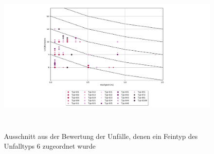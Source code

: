 \begin{savenotes}
	\begin{figure}[H]
		\centering
		\includegraphics[width=12cm,height=8cm]{figures/Bewertung_FT6(2)}
		\caption[Ausschnitt aus der Bewertung der Unfälle, denen ein Feintyp des Unfalltyps 6 zugeordnet wurde]{Ausschnitt aus der Bewertung der Unfälle, denen ein Feintyp des Unfalltyps 6 zugeordnet wurde}\label{fig:Bewertung_FT6(2)}
	\end{figure}
\end{savenotes}